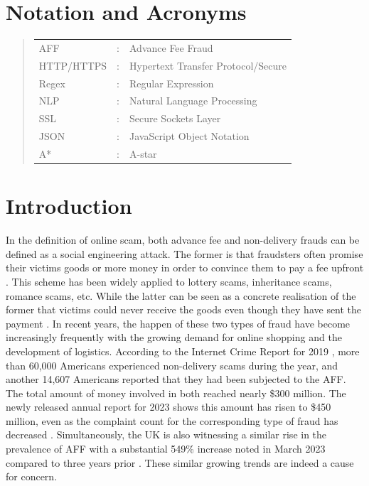 \documentclass[ oneside,%
                    author={Cassie Qing Tang},
                    degree={BSc},
                     title={An Automated Response System for Disrupting Online Pet Scamming \\ },
                    subtitle={ }]{dissertation}
\begin{document}
\chapter*{Notation and Acronyms}
\begin{quote}
\noindent
\begin{tabular}{lcl}
AFF                 &:     & Advance Fee Fraud    
 \\ 
HTTP/HTTPS          &:     & Hypertext Transfer Protocol/Secure
 \\ 
Regex               &:     & Regular Expression
\\
NLP                 &:     & Natural Language Processing
\\
SSL                 &:     & Secure Sockets Layer
\\
JSON                &:     & JavaScript Object Notation
\\
A*                  &:     & A-star


\end{tabular}
\end{quote}


\mainmatter

\chapter{Introduction}
\label{chap:context}
In the definition of online scam, both advance fee and non-delivery frauds can be defined as a social engineering attack. The former is that fraudsters often promise their victims goods or more money in order to convince them to pay a fee upfront \cite{claude_toward_2014}. This scheme has been widely applied to lottery scams, inheritance scams, romance scams, etc. While the latter can be seen as a concrete realisation of the former that victims could never receive the goods even though they have sent the payment \cite{whittaker_understanding_2020}. In recent years, the happen of these two types of fraud have become increasingly frequently with the growing demand for online shopping and the development of logistics. According to the Internet Crime Report for 2019 \cite{noauthor_2019_nodate}, more than 60,000 Americans experienced non-delivery scams during the year, and another 14,607 Americans reported that they had been subjected to the AFF. The total amount of money involved in both reached nearly \$300 million. The newly released annual report for 2023 shows this amount has risen to \$450 million, even as the complaint count for the corresponding type of fraud has decreased \cite{noauthor_2023_nodate}. Simultaneously, the UK is also witnessing a similar rise in the prevalence of AFF with a substantial 549\% increase noted in March 2023 compared to three years prior \cite{stripe_crime_2023}. These similar growing trends are indeed a cause for concern.
\end{document}
